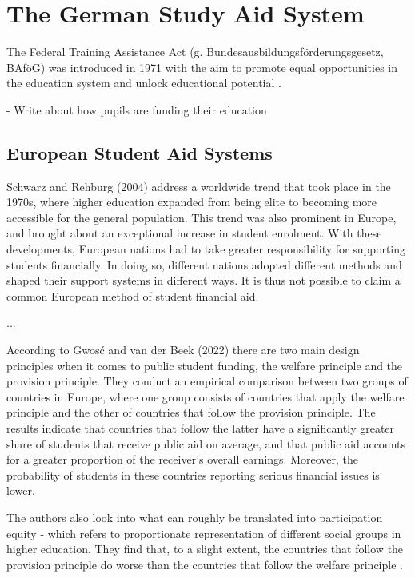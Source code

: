\section{The German Study Aid System} 
\label{section:the-german-study-aid-system}

The Federal Training Assistance Act (g. Bundesausbildungsförderungsgesetz, BAföG) was introduced in 1971 with the aim to promote equal opportunities in the education system and unlock educational potential \citep{meier_bafog_2024}.

- Write about how pupils are funding their education 

\subsection{European Student Aid Systems } \label{subsection:european-student-aid-systems} 

Schwarz and Rehburg (2004) address a worldwide trend that took place in the 1970s, where higher education expanded from being elite to becoming more accessible for the general population. This trend was also prominent in Europe, and brought about an exceptional increase in student enrolment. With these developments, European nations had to take greater responsibility for supporting students financially. In doing so, different nations adopted different methods and shaped their support systems in different ways. It is thus not possible to claim a common European method of student financial aid.

...

According to Gwosć and van der Beek (2022) there are two main design principles when it comes to public student funding, the welfare principle and the provision principle. They conduct an empirical comparison between two groups of countries in Europe, where one group consists of countries that apply the welfare principle and the other of countries that follow the provision principle. The results indicate that countries that follow the latter have a significantly greater share of students that receive public aid on average, and that public aid accounts for a greater proportion of the receiver’s overall earnings. Moreover, the probability of students in these countries reporting serious financial issues is lower.

The authors also look into what can roughly be translated into participation equity - which refers to proportionate representation of different social groups in higher education. They find that, to a slight extent, the countries that follow the provision principle do worse than the countries that follow the welfare principle \citep{gwosc_krisenbewaltigung_2022}.

